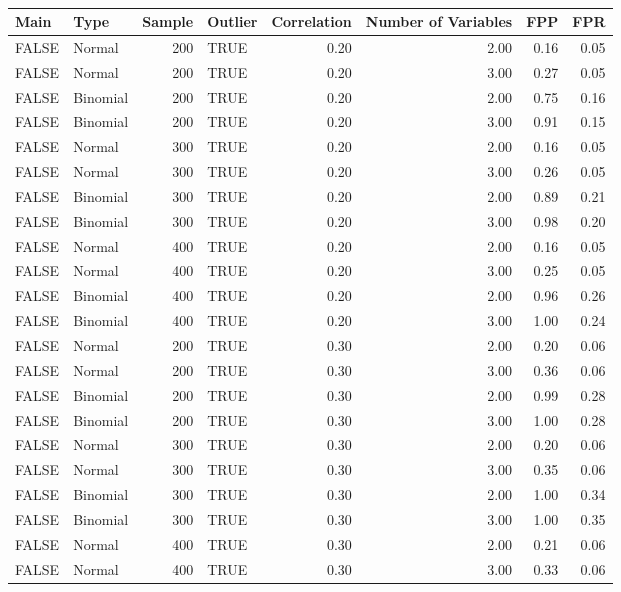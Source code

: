 \begin{longtable}{llrlrrrr}
\caption{} \\ 
  \hline
Main & Type & Sample & Outlier & Correlation & Number of Variables & FPP & FPR \\ 
  \hline
FALSE & Normal & 200 & TRUE & 0.20 & 2.00 & 0.16 & 0.05 \\ 
  FALSE & Normal & 200 & TRUE & 0.20 & 3.00 & 0.27 & 0.05 \\ 
  FALSE & Binomial & 200 & TRUE & 0.20 & 2.00 & 0.75 & 0.16 \\ 
  FALSE & Binomial & 200 & TRUE & 0.20 & 3.00 & 0.91 & 0.15 \\ 
  FALSE & Normal & 300 & TRUE & 0.20 & 2.00 & 0.16 & 0.05 \\ 
  FALSE & Normal & 300 & TRUE & 0.20 & 3.00 & 0.26 & 0.05 \\ 
  FALSE & Binomial & 300 & TRUE & 0.20 & 2.00 & 0.89 & 0.21 \\ 
  FALSE & Binomial & 300 & TRUE & 0.20 & 3.00 & 0.98 & 0.20 \\ 
  FALSE & Normal & 400 & TRUE & 0.20 & 2.00 & 0.16 & 0.05 \\ 
  FALSE & Normal & 400 & TRUE & 0.20 & 3.00 & 0.25 & 0.05 \\ 
  FALSE & Binomial & 400 & TRUE & 0.20 & 2.00 & 0.96 & 0.26 \\ 
  FALSE & Binomial & 400 & TRUE & 0.20 & 3.00 & 1.00 & 0.24 \\ 
  FALSE & Normal & 200 & TRUE & 0.30 & 2.00 & 0.20 & 0.06 \\ 
  FALSE & Normal & 200 & TRUE & 0.30 & 3.00 & 0.36 & 0.06 \\ 
  FALSE & Binomial & 200 & TRUE & 0.30 & 2.00 & 0.99 & 0.28 \\ 
  FALSE & Binomial & 200 & TRUE & 0.30 & 3.00 & 1.00 & 0.28 \\ 
  FALSE & Normal & 300 & TRUE & 0.30 & 2.00 & 0.20 & 0.06 \\ 
  FALSE & Normal & 300 & TRUE & 0.30 & 3.00 & 0.35 & 0.06 \\ 
  FALSE & Binomial & 300 & TRUE & 0.30 & 2.00 & 1.00 & 0.34 \\ 
  FALSE & Binomial & 300 & TRUE & 0.30 & 3.00 & 1.00 & 0.35 \\ 
  FALSE & Normal & 400 & TRUE & 0.30 & 2.00 & 0.21 & 0.06 \\ 
  FALSE & Normal & 400 & TRUE & 0.30 & 3.00 & 0.33 & 0.06 \\ 

\end{longtable}
